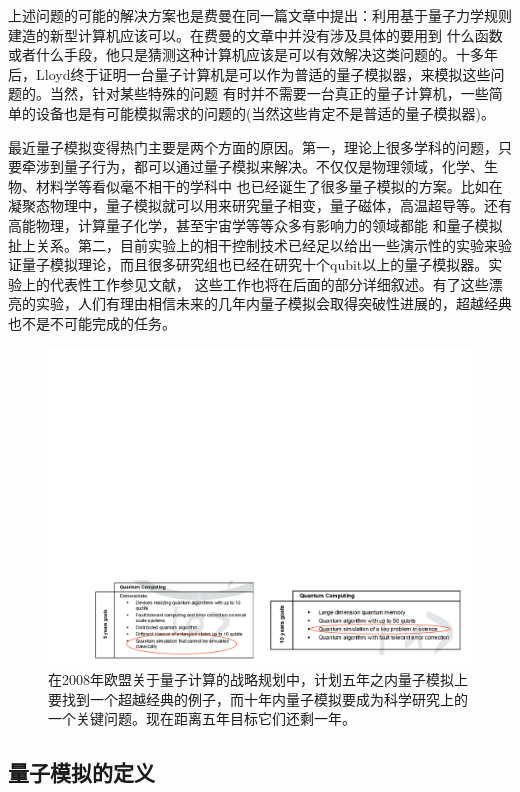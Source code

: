 上述问题的可能的解决方案也是费曼在同一篇文章中提出：利用基于量子力学规则建造的新型计算机应该可以\cite{Feynman2}。在费曼的文章中并没有涉及具体的要用到
什么函数或者什么手段，他只是猜测这种计算机应该是可以有效解决这类问题的。十多年后，Lloyd终于证明一台量子计算机是可以作为普适的量子模拟器，来模拟这些问题的\cite{Lloyd}。当然，针对某些特殊的问题
有时并不需要一台真正的量子计算机，一些简单的设备也是有可能模拟需求的问题的(当然这些肯定不是普适的量子模拟器)。

最近量子模拟变得热门主要是两个方面的原因。第一，理论上很多学科的问题，只要牵涉到量子行为，都可以通过量子模拟来解决。不仅仅是物理领域，化学、生物、材料学等看似毫不相干的学科中
也已经诞生了很多量子模拟的方案。比如在凝聚态物理中，量子模拟就可以用来研究量子相变，量子磁体，高温超导等。还有高能物理，计算量子化学，甚至宇宙学等等众多有影响力的领域都能
和量子模拟扯上关系。第二，目前实验上的相干控制技术已经足以给出一些演示性的实验来验证量子模拟理论，而且很多研究组也已经在研究十个qubit以上的量子模拟器。实验上的代表性工作参见文献\cite{ionphase,mott,dirac,optics_static}，
这些工作也将在后面的部分详细叙述。有了这些漂亮的实验，人们有理由相信未来的几年内量子模拟会取得突破性进展的，超越经典也不是不可能完成的任务。

\begin{figure}[htbp]
            \begin{center}
              \includegraphics[width= 0.8\columnwidth]{figures/eu.pdf}
              \caption{在2008年欧盟关于量子计算的战略规划中，计划五年之内量子模拟上要找到一个超越经典的例子，而十年内量子模拟要成为科学研究上的一个关键问题。现在距离五年目标它们还剩一年。
              }
              \label{eu}
            \end{center}
        \end{figure}


\subsection{量子模拟的定义}


